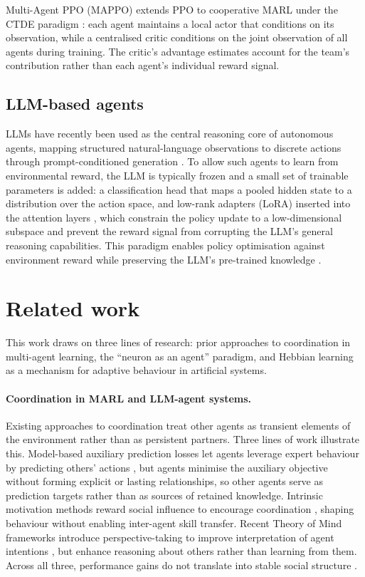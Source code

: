 \documentclass{article}
\theoremstyle{plain}
\theoremstyle{definition}
\theoremstyle{remark}
\begin{document}
Multi-Agent PPO (MAPPO) extends PPO to cooperative MARL under the CTDE paradigm \cite{yu2022surprising}: each agent maintains a local actor that conditions on its observation, while a centralised critic conditions on the joint observation of all agents during training. The critic's advantage estimates account for the team's contribution rather than each agent's individual reward signal.

\subsection*{LLM-based agents}
LLMs have recently been used as the central reasoning core of autonomous agents, mapping structured natural-language observations to discrete actions through prompt-conditioned generation \cite{xi2025rise}. To allow such agents to learn from environmental reward, the LLM is typically frozen and a small set of trainable parameters is added: a classification head that maps a pooled hidden state to a distribution over the action space, and low-rank adapters (LoRA) inserted into the attention layers \cite{hu2022lora}, which constrain the policy update to a low-dimensional subspace and prevent the reward signal from corrupting the LLM's general reasoning capabilities. This paradigm enables policy optimisation against environment reward while preserving the LLM's pre-trained knowledge \cite{qian2025toolrl}.

\section{Related work}
\label{related}

This work draws on three lines of research: prior approaches to coordination in multi-agent learning, the ``neuron as an agent'' paradigm, and Hebbian learning as a mechanism for adaptive behaviour in artificial systems.

\paragraph{Coordination in MARL and LLM-agent systems.} Existing approaches to coordination treat other agents as transient elements of the environment rather than as persistent partners. Three lines of work illustrate this. Model-based auxiliary prediction losses let agents leverage expert behaviour by predicting others' actions \cite{ndousse2021emergent}, but agents minimise the auxiliary objective without forming explicit or lasting relationships, so other agents serve as prediction targets rather than as sources of retained knowledge. Intrinsic motivation methods reward social influence to encourage coordination \cite{jaques2019social}, shaping behaviour without enabling inter-agent skill transfer. Recent Theory of Mind frameworks introduce perspective-taking to improve interpretation of agent intentions \cite{licua2025mindforge}, but enhance reasoning about others rather than learning from them. Across all three, performance gains do not translate into stable social structure \cite{ye2025efficient}.
\end{document}

